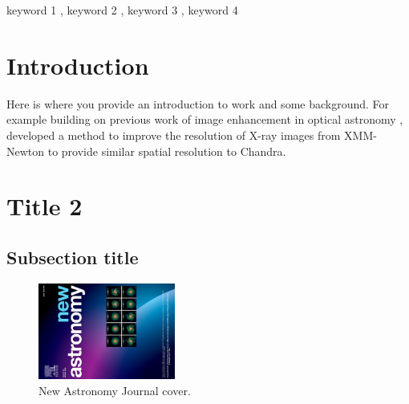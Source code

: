 \documentclass[final,5p,times,twocolumn,authoryear]{elsarticle}
\begin{document}
\begin{frontmatter}
	\begin{keyword}
		keyword 1 \sep{} keyword 2 \sep{} keyword 3 \sep{} keyword 4



	\end{keyword}


\end{frontmatter}




\section{Introduction}\label{introduction}

Here is where you provide an introduction to work and some background. For example building on previous work of image enhancement in optical astronomy \citep{vojtekova2021learning},~\cite{sweere2022deep} developed a method to improve the resolution of X-ray images from XMM-Newton to provide similar spatial resolution to Chandra.

\section{Title 2}
\lipsum[1]

\subsection{Subsection title}

\begin{figure}
	\centering
	\includegraphics[width=0.4\textwidth, angle=-90]{images/NEASPA_cover_image.pdf}
	\caption{New Astronomy Journal cover.}\label{fig_mom0}
\end{figure}
\end{document}
